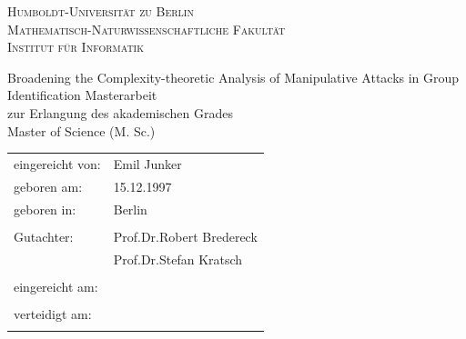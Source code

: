 \documentclass[
    12pt,               %
    a4paper,            %
    bibtotoc,           %
    pointlessnumbers,   %
    ngerman,            %
    titlepage,          %
    leqno,              %
    ]{scrarticle}       %
\makeatletter
\newcommand{\topic}{Broadening the Complexity-theoretic Analysis of Manipulative Attacks in Group Identification}
\newcommand{\type}{Masterarbeit}
\newcommand{\authorName}{Emil Junker}
\newcommand{\authorBdate}{15.12.1997}
\newcommand{\authorBplace}{Berlin}
\newcommand{\supervisorA}{Prof.\@ Dr.\@ Robert Bredereck}
\newcommand{\supervisorB}{Prof.\@ Dr.\@  Stefan Kratsch}
\makeatother
\begin{document}

\pagestyle{empty}

\begin{titlepage}

\begin{minipage}[c][3cm][c]{12cm}
\textsc{
    \hspace{-1.2em}
    \Large{
        Humboldt-Universität zu Berlin \\
    }
    \normalsize{
        Mathematisch-Naturwissenschaftliche Fakultät \\
        Institut für Informatik
    }
}
\end{minipage}
\hfill

\vfill
\linespread{1.5}

\begin{center}
\huge\topic
\vspace{1em}
\Large{
    \type \\
    \vspace{1em}
    zur Erlangung des akademischen Grades \\
    Master of Science (M. Sc.)
    \vspace{\baselineskip}
}
\end{center}

\vfill
\linespread{1}

\large{
    \begin{tabularx}{\textwidth}{ll}
    eingereicht von:    & \authorName \\
    geboren am:         & \authorBdate \\
    geboren in:         & \authorBplace \\
    \vspace{0.5\baselineskip} \\
    Gutachter:          & \supervisorA \\
                        & \supervisorB \\
    \vspace{\baselineskip} \\
    eingereicht am:     & \raisebox{-\height}{\parbox{0.3\linewidth}{\dotfill}} \\
    \vspace{\baselineskip} \\
    verteidigt am:      & \raisebox{-\height}{\parbox{0.3\linewidth}{\dotfill}} \\
    \vspace{\baselineskip} \\
    \end{tabularx}
}

\end{titlepage}
\end{document}
